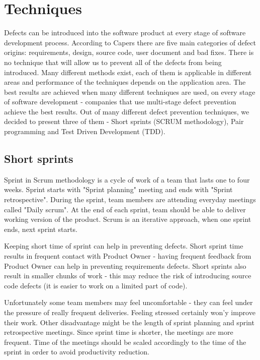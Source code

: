 \section{Techniques}
Defects can be introduced into the software product at every stage of software development process. According to Capers\cite{capers} there are five main categories of defect origins: requirements, design, source code, user document and bad fixes. There is no technique that will allow us to prevent all of the defects from being introduced. Many different methods exist, each of them is applicable in different areas and performance of the techniques depends on the application area. The best results are achieved when many different techniques are used, on every stage of software development - companies that use multi-stage defect prevention achieve the best results\cite{capers}. Out of many different defect prevention techniques, we decided to present three of them - Short sprints (SCRUM methodology), Pair programming and Test Driven Development (TDD).
 
\subsection{Short sprints}
Sprint in Scrum methodology is a cycle of work of a team that lasts one to four weeks. Sprint starts with "Sprint planning" meeting and ends with "Sprint retrospective". During the sprint, team members are attending everyday meetings called "Daily scrum". At the end of each sprint, team should be able to deliver working version of the product. Scrum is an iterative approach, when one sprint ends, next sprint starts.

Keeping short time of sprint can help in preventing defects. Short sprint time results in frequent contact with Product Owner - having frequent feedback from Product Owner can help in preventing requirements defects. Short sprints also result in smaller chunks of work - this may reduce the risk of introducing source code defects (it is easier to work on a limited part of code).   

Unfortunately some team members may feel uncomfortable - they can feel under the pressure of really frequent deliveries. Feeling stressed certainly won'y improve their work. Other disadvantage might be the length of sprint planning and sprint retrospective meetings. Since sprint time is shorter, the meetings are more frequent. Time of the meetings should be scaled accordingly to the time of the sprint in order to avoid productivity reduction.

